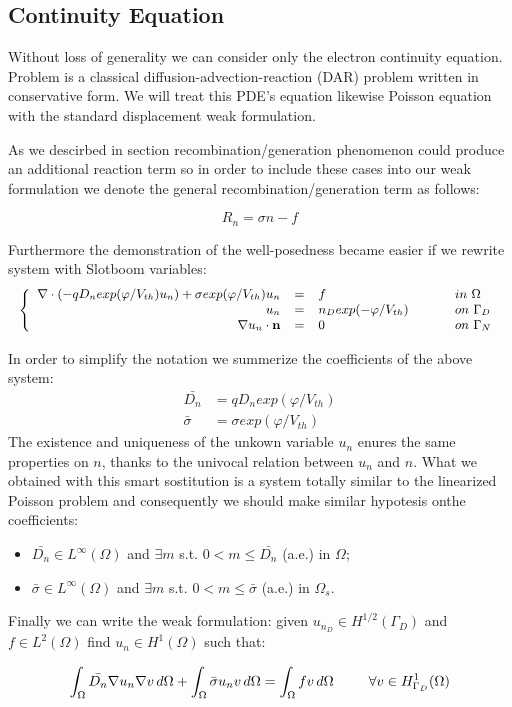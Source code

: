 \subsection{Continuity Equation}

Without loss of generality we can consider only the electron continuity equation. Problem  is a classical diffusion-advection-reaction (DAR) problem written in conservative form. We will treat this PDE's equation likewise Poisson equation with the standard displacement weak formulation.

As we descirbed in section  recombination/generation phenomenon could produce an additional reaction term so in order to include these cases into our weak formulation we denote the general recombination/generation term as follows:

\begin{equation}
R_n = \sigma n - f
\end{equation}

Furthermore the demonstration of the well-posedness became easier if we rewrite system  with Slotboom variables:
\begin{equation}
\small
\left\{
\begin{array}{rcll}
 \nabla \cdot \left( - q D_n exp(\varphi/V_{th}) u_n \right) + \sigma exp(\varphi/V_{th}) u_n& = & f  & \psp{15} in \psp{2} \Omega \\
u_n & = &  n_D exp(-\varphi/V_{th}) & \psp{15} on \psp{2} \Gamma_D \\
\nabla u_n \cdot \vect{n} & = & 0 & \psp{15} on \psp{2} \Gamma_N
\end{array}
\right.
\end{equation}

In order to simplify the notation we summerize the coefficients of the above system:
\begin{align*}
\bar{D_n} & = q D_n exp(\varphi/V_{th}) \\
\bar{\sigma}  & = \sigma exp(\varphi/V_{th})
\end{align*}
The existence and uniqueness of the unkown variable $u_n$ enures the same properties on $n$, thanks to the univocal relation between $u_n$ and $n$.
What we obtained with this smart sostitution is a system totally similar to the linearized Poisson problem and consequently we should make similar hypotesis onthe coefficients:
\begin{itemize}
\item $\bar{D_n} \in L^{\infty}(\Omega)$ and $\exists m$ s.t. $0 < m \leq \bar{D_n}$ (a.e.) in $\Omega$;
\item  $\bar{\sigma} \in L^{\infty}(\Omega)$ and $\exists m$ s.t. $0 < m \leq \bar{\sigma}$ (a.e.) in $\Omega_s$.
\end{itemize}
Finally we can write the weak formulation: given $u_{n_D} \in H^{1/2}(\Gamma_D)$ and $f \in L^2(\Omega)$ find $u_n \in H^1(\Omega)$ such that:

\begin{equation}
\label{eq: LEC weakformulation}
\int_{\Omega} \bar{D_n} \nabla u_n \nabla v \, d\Omega + \int_{\Omega} \bar{\sigma} u_n v \, d\Omega = \int_{\Omega} f v \, d\Omega \psp{15} \forall v \in H^1_{\Gamma_D}(\Omega)
\end{equation}
